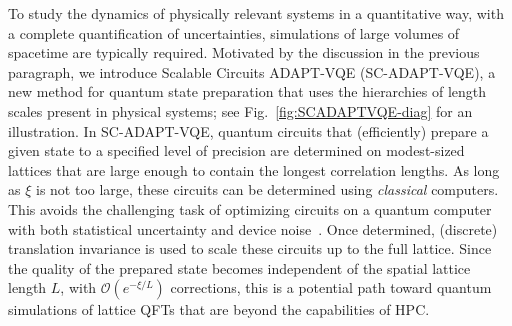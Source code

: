 \documentclass[aps, pra, onecolumn, tightenlines, letterpaper, amsmath, amssymb, preprintnumbers, floatfix, longbibliography, nofootinbib]{revtex4-2}
\begin{document}
To study the dynamics of physically relevant systems in a quantitative way,
with a complete quantification of uncertainties,
simulations of large volumes of spacetime are typically required.
Motivated by the discussion in the previous paragraph, we introduce Scalable Circuits ADAPT-VQE (SC-ADAPT-VQE), a new method for quantum state preparation that uses the hierarchies of length scales present in physical systems; see Fig.~\ref{fig:SCADAPTVQE-diag} for an illustration.
In SC-ADAPT-VQE, 
quantum circuits that (efficiently) prepare a given state to a specified level of precision
are determined on modest-sized lattices that are large enough to contain the longest correlation lengths.
As long as $\xi$ is not too large, these circuits can be determined using {\it classical} computers.
This avoids the challenging task of optimizing circuits on a quantum computer with both statistical uncertainty and device noise~\cite{Wang:2020yjh,Scriva:2023sgz}.
Once determined, (discrete) translation invariance is used to scale these circuits up to the full lattice.
Since the quality of the prepared state becomes 
independent of the spatial lattice length $L$, 
with ${\mathcal O}(e^{-\xi/L})$ corrections,
this is a potential path toward 
quantum simulations of lattice QFTs
that are beyond the capabilities of HPC.
\end{document}
